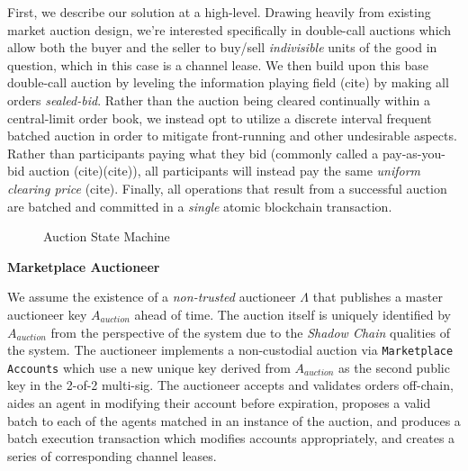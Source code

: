 \documentclass[10pt,a4paper]{article}
\theoremstyle{definition}
\begin{document}
First, we describe our solution at a high-level. Drawing heavily from existing
market auction design, we're interested specifically in double-call auctions
which allow both the buyer and the seller to buy/sell \emph{indivisible} units
of the good in question, which in this case is a channel lease. We then build
upon this base double-call auction by leveling the information playing field
(cite) by making all orders \emph{sealed-bid}. Rather than the auction being
cleared continually within a central-limit order book, we instead opt to
utilize a discrete interval frequent batched auction in order to mitigate
front-running and other undesirable aspects. Rather than participants paying
what they bid (commonly called a pay-as-you-bid auction (cite)(cite)), all
participants will instead pay the same \emph{uniform clearing price} (cite).
Finally, all operations that result from a successful auction are batched and
committed in a \emph{single} atomic blockchain transaction.

\clearpage

\begin{figure}[!htb]


\caption{Auction State Machine}

\end{figure}


\begin{center}
    \textbf{Marketplace Auctioneer}
\end{center}

We assume the existence of a \emph{non-trusted} auctioneer $\Lambda$ that
publishes a master auctioneer key $A_{auction}$ ahead of time. The auction
itself is uniquely identified by $A_{auction}$ from the perspective of the
system due to the \emph{Shadow Chain} qualities of the system. The auctioneer
implements a non-custodial auction via \texttt{Marketplace Accounts} which use
a new unique key derived from $A_{auction}$ as the second public key in the
2-of-2 multi-sig. The auctioneer accepts and validates orders off-chain, aides
an agent in modifying their account before expiration, proposes a valid batch
to each of the agents matched in an instance of the auction, and produces a
batch execution transaction which modifies accounts appropriately, and creates
a series of corresponding channel leases.
\end{document}
